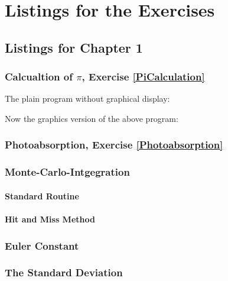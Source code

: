 %
%

\chapter{Listings for the Exercises}
\small

\section{Listings for Chapter 1}

\subsection{Calcualtion of $\pi$, Exercise \ref{PiCalculation}}
The plain program without graphical display:

Now the graphics version of the above program:


\subsection{Photoabsorption, Exercise \ref{Photoabsorption}}

\subsection{Monte-Carlo-Intgegration}
\subsubsection{Standard Routine}
\subsubsection{Hit and Miss Method}

\subsection{Euler Constant}

\subsection{The Standard Deviation}

